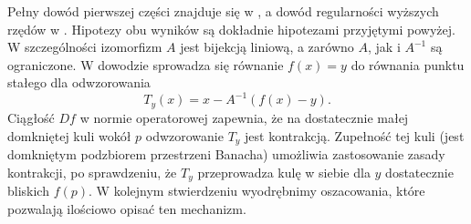 Pełny dowód pierwszej części znajduje się w
,
a dowód regularności wyższych rzędów w
.
Hipotezy obu wyników są dokładnie hipotezami przyjętymi
powyżej. W szczególności izomorfizm $A$ jest bijekcją
liniową, a zarówno $A$, jak i $A^{-1}$ są ograniczone.
W dowodzie sprowadza się równanie $f(x)=y$
do równania punktu stałego dla odwzorowania
\[
 T_y(x)=x-A^{-1}(f(x)-y).
\]
Ciągłość $Df$ w normie operatorowej zapewnia, że na
dostatecznie małej domkniętej kuli wokół $p$
odwzorowanie $T_y$ jest kontrakcją. Zupełność
tej kuli (jest domkniętym podzbiorem przestrzeni Banacha)
umożliwia zastosowanie zasady kontrakcji, po sprawdzeniu,
że $T_y$ przeprowadza kulę w siebie dla $y$ dostatecznie
bliskich $f(p)$.
W kolejnym stwierdzeniu wyodrębnimy oszacowania,
które pozwalają ilościowo opisać ten mechanizm.

